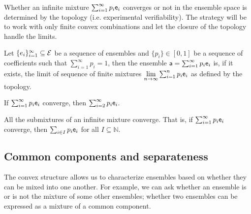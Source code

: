 Whether an infinite mixture $\sum_{i=1}^\infty p_i \ens_i$ converges or not in the ensemble space is determined by the topology (i.e. experimental verifiability). The strategy will be to work with only finite convex combinations and let the closure of the topology handle the limits.

\begin{mathSection}
\begin{defn}
	Let $\{e_i\}_{i=1}^{\infty} \subseteq \Ens$ be a sequence of ensembles and $\{p_i\} \in [0,1]$ be a sequence of coefficients such that $\sum_{i=1}^{\infty} p_i = 1$, then the ensemble $\ens[a] = \sum_{i=1}^{\infty} p_i \ens_i$ is, if it exists, the limit of sequence of finite mixtures $\lim\limits_{n\to\infty} \sum_{i=1}^{n} p_i \ens_i$  as defined by the topology.
\end{defn}
\end{mathSection}

\begin{conj}
	If $\sum_{i=1}^{\infty} p_i \ens_i$ converge, then $\sum_{i=2}^{\infty} p_i \ens_i$.
\end{conj}

\begin{conj}
	All the submixtures of an infinite mixture converge. That is, if $\sum_{i=1}^{\infty} p_i \ens_i$ converge, then $\sum_{i \in I} p_i \ens_i$ for all $I \subseteq \mathbb{N}$.
\end{conj}

\subsection{Common components and separateness}

The convex structure allows us to characterize ensembles based on whether they can be mixed into one another. For example, we can ask whether an ensemble is or is not the mixture of some other ensembles; whether two ensembles can be expressed as a mixture of a common component.

